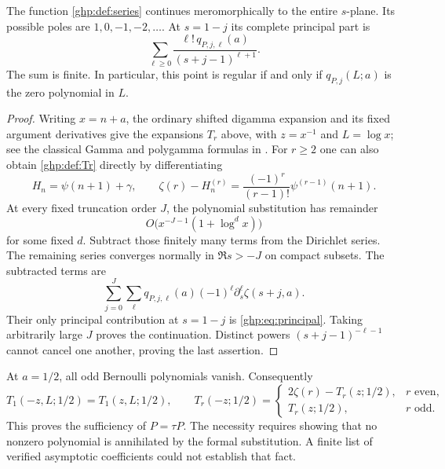 \begin{proposition}
\label{ghp:prop:principal}
The function \eqref{ghp:def:series} continues meromorphically to the
entire $s$-plane. Its possible poles are $1,0,-1,-2,\ldots$. At
$s=1-j$ its complete principal part is
\begin{equation}\label{ghp:eq:principal}
 \sum_{\ell\geq0}\frac{\ell!\,q_{P,j,\ell}(a)}{(s+j-1)^{\ell+1}}.
\end{equation}
The sum is finite. In particular, this point is regular if and only if
$q_{P,j}(L;a)$ is the zero polynomial in $L$.
\end{proposition}

\begin{proof}
Writing $x=n+a$, the ordinary shifted digamma expansion and its fixed
argument derivatives give the expansions $T_r$ above, with $z=x^{-1}$
and $L=\log x$; see the classical Gamma and polygamma formulas in
\cite[\S\S5.11, 5.15]{DLMF}. For $r\geq2$ one can also obtain
\eqref{ghp:def:Tr} directly by differentiating
\[
 H_n=\psi(n+1)+\gamma,
 \qquad
 \zeta(r)-H_n^{(r)}=
       \frac{(-1)^r}{(r-1)!}\psi^{(r-1)}(n+1).
\]
At every fixed truncation order $J$, the polynomial substitution has
remainder
\[
 O\bigl(x^{-J-1}(1+\log^d x)\bigr)
\]
for some fixed $d$.
Subtract those finitely many terms from the Dirichlet series. The
remaining series converges normally in $\Re s>-J$ on compact subsets.
The subtracted terms are
\[
 \sum_{j=0}^J\sum_\ell
   q_{P,j,\ell}(a)(-1)^\ell\partial_s^\ell\zeta(s+j,a).
\]
Their only principal contribution at $s=1-j$ is
\eqref{ghp:eq:principal}. Taking arbitrarily large $J$ proves the
continuation. Distinct powers $(s+j-1)^{-\ell-1}$ cannot cancel one
another, proving the last assertion.
\end{proof}

At $a=1/2$, all odd Bernoulli polynomials vanish. Consequently
\begin{equation}\label{ghp:eq:formal-parity}
 T_1(-z,L;1/2)=T_1(z,L;1/2),\qquad
 T_r(-z;1/2)=\begin{cases}
  2\zeta(r)-T_r(z;1/2),&r\text{ even},\\
  T_r(z;1/2),&r\text{ odd}.
 \end{cases}
\end{equation}
This proves the sufficiency of $P=\tau P$. The necessity requires
showing that no nonzero polynomial is annihilated by the formal
substitution. A finite list of verified asymptotic coefficients could
not establish that fact.


